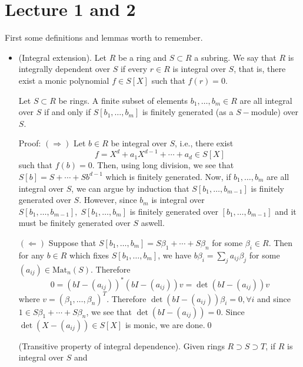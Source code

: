 \section{Lecture 1 and 2}
First some definitions and lemmas worth to remember.
\begin{itemize}
    \item (Integral extension). Let $R$ be a ring and $S\subset R$ a subring. We say that 
    $R$ is integrally dependent over $S$ if every $r\in R$ is integral over $S$, that is, there 
    exist a monic polynomial $f\in S[X]$ such that $f(r)=0$.
    \begin{lemma}\label{lemma : characterization of integral extensions}
        Let $S\subset R$ be rings. 
        A finite subset of elements $b_1,\dots, b_m\in R$ are all integral over $S$ if and only if 
        $S[b_1,\dots, b_m]$ is finitely generated (as a $S-$module) over $S$.
    \end{lemma}
    Proof: $(\Rightarrow)$ Let $b\in R$ be integral over $S$, i.e., there exist 
    \begin{equation}
     f =    X^d + a_1X^{d-1} +\cdots + a_d \in S[X]
    \end{equation}
    such that $f(b)=0$. Then, using long division, we see that $S[b]=S +\cdots + S b^{d-1}$ which is finitely generated. 
    Now, if $b_1,\dots, b_m$ are all integral over $S$, we can argue by induction that $S[b_1,\dots, b_{m-1}]$ is finitely generated 
    over $S$. However, since $b_m$ is integral over $S[b_1,\dots, b_{m-1}],\;S[b_1,\dots,b_m]$ is finitely generated 
    over $[b_1,\dots, b_{m-1}]$ and it must be finitely generated over $S$ aswell.\par  
    $(\Leftarrow)$ Suppose that $S[b_1,\dots, b_m] = S\beta_1+\cdots+S\beta_n$ for some $\beta_i\in R$. Then for any 
    $b\in R$ which fixes $S[b_1,\dots,b_m]$, we have $b\beta_i= \sum_j a_{ij}\beta_j$ for some $(a_{ij})\in\text{Mat}_n(S)$. 
    Therefore 
    \begin{equation}
      0 =  (bI-(a_{ij}))^*(bI-(a_{ij}))v = \det(bI-(a_{ij}))v
    \end{equation}
    where $v=(\beta_1,\dots,\beta_n)^T$. Therefore $\det(bI-(a_{ij}))\beta_i=0,\forall i$ and since 
    $1\in S\beta_1+\cdots+S\beta_n$, we see that $\det(bI-(a_{ij}))=0$. Since $\det(X-(a_{ij}))\in S[X]$ is monic, we 
    are done.\qed 
    \begin{corollary}\label{corollary : transitive property integral dependence}
        (Transitive property of integral dependence). Given rings $R \supset S\supset T$, if $R$ is integral over $S$ and 

\end{corollary}
\end{itemize}

